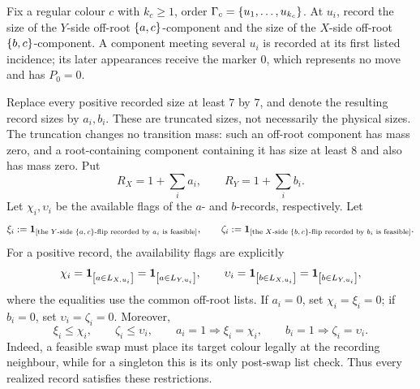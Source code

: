 \begin{definition}\label{def:cv-component-records}
Fix a regular colour $c$ with $k_c\ge1$, order
$\Gamma_c=\left\{u_1,\ldots,u_{k_c}\right\}$.  At $u_i$, record the size
of the $Y$-side off-root $\left\{a,c\right\}$-component and the size of the
$X$-side off-root $\left\{b,c\right\}$-component.  A component meeting several
$u_i$ is recorded at its first listed incidence; its later appearances receive
the marker $0$, which represents no move and has $P_0=0$.

Replace every positive recorded size at least $7$ by $7$, and denote the
resulting record sizes by $a_i,b_i$.  These are truncated sizes, not
necessarily the physical sizes.  The truncation changes no transition mass:
such an off-root component has mass zero, and a root-containing component
containing it has size at least $8$ and also has mass zero.  Put
\[
  R_X=1+\sum_i a_i,\qquad R_Y=1+\sum_i b_i.
\]
 Let $\chi_i,\upsilon_i$ be the available flags of the \(a\)- and
\(b\)-records, respectively.  Let
\[
 \xi_i:=\mathbf{1}_{\left[\text{the \(Y\)-side \(\{a,c\}\)-flip recorded by \(a_i\)
                         is feasible}\right]},\qquad
 \zeta_i:=\mathbf{1}_{\left[\text{the \(X\)-side \(\{b,c\}\)-flip recorded by \(b_i\)
                         is feasible}\right]} .
\]
For a positive record, the availability flags are explicitly
\[
  \chi_i=\mathbf{1}_{\left[a\in L_{X,u_i}\right]}=\mathbf{1}_{\left[a\in L_{Y,u_i}\right]},
  \qquad
  \upsilon_i=\mathbf{1}_{\left[b\in L_{X,u_i}\right]}=\mathbf{1}_{\left[b\in L_{Y,u_i}\right]},
\]
where the equalities use the common off-root lists.  If \(a_i=0\), set
\(\chi_i=\xi_i=0\); if \(b_i=0\), set
\(\upsilon_i=\zeta_i=0\).  Moreover,
\[
  \xi_i\le\chi_i,\qquad \zeta_i\le\upsilon_i,\qquad
  a_i=1\Longrightarrow\xi_i=\chi_i,\qquad
  b_i=1\Longrightarrow\zeta_i=\upsilon_i.
\]
Indeed, a feasible swap must place its target colour legally at the
recording neighbour, while for a singleton this is its only post-swap list
check.  Thus every realized record satisfies these restrictions.


\end{definition}
